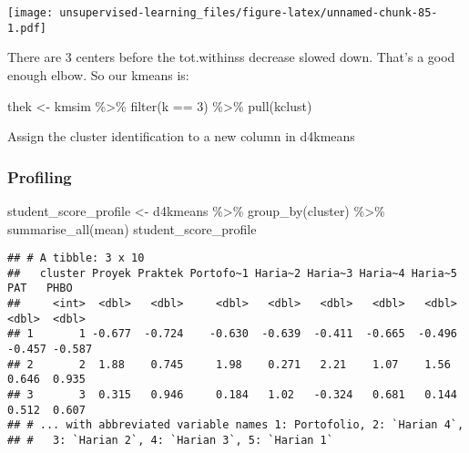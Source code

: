 \documentclass[
]{article}
\newenvironment{Shaded}{\begin{snugshade}}{\end{snugshade}}
\newcommand{\DecValTok}[1]{\textcolor[rgb]{0.00,0.00,0.81}{#1}}
\newcommand{\FunctionTok}[1]{\textcolor[rgb]{0.00,0.00,0.00}{#1}}
\newcommand{\NormalTok}[1]{#1}
\newcommand{\OtherTok}[1]{\textcolor[rgb]{0.56,0.35,0.01}{#1}}
\newcommand{\SpecialCharTok}[1]{\textcolor[rgb]{0.00,0.00,0.00}{#1}}
\begin{document}
\texttt{[image: unsupervised-learning\_files/figure-latex/unnamed-chunk-85-1.pdf]}

There are 3 centers before the tot.withinss decrease slowed down. That's
a good enough elbow. So our kmeans is:

\begin{Shaded}
\begin{Highlighting}[]
\NormalTok{thek }\OtherTok{\textless{}{-}}\NormalTok{ kmsim }\SpecialCharTok{\%\textgreater{}\%} 
  \FunctionTok{filter}\NormalTok{(k }\SpecialCharTok{==} \DecValTok{3}\NormalTok{) }\SpecialCharTok{\%\textgreater{}\%} 
  \FunctionTok{pull}\NormalTok{(kclust)}
\end{Highlighting}
\end{Shaded}

Assign the cluster identification to a new column in d4kmeans

\begin{Shaded}
\end{Shaded}

\hypertarget{profiling}{%
\subsubsection{Profiling}\label{profiling}}

\begin{Shaded}
\begin{Highlighting}[]
\NormalTok{student\_score\_profile }\OtherTok{\textless{}{-}} 
\NormalTok{d4kmeans }\SpecialCharTok{\%\textgreater{}\%} 
  \FunctionTok{group\_by}\NormalTok{(cluster) }\SpecialCharTok{\%\textgreater{}\%} 
  \FunctionTok{summarise\_all}\NormalTok{(mean)}
\NormalTok{student\_score\_profile}
\end{Highlighting}
\end{Shaded}

\begin{verbatim}
## # A tibble: 3 x 10
##   cluster Proyek Praktek Portofo~1 Haria~2 Haria~3 Haria~4 Haria~5    PAT   PHBO
##     <int>  <dbl>   <dbl>     <dbl>   <dbl>   <dbl>   <dbl>   <dbl>  <dbl>  <dbl>
## 1       1 -0.677  -0.724    -0.630  -0.639  -0.411  -0.665  -0.496 -0.457 -0.587
## 2       2  1.88    0.745     1.98    0.271   2.21    1.07    1.56   0.646  0.935
## 3       3  0.315   0.946     0.184   1.02   -0.324   0.681   0.144  0.512  0.607
## # ... with abbreviated variable names 1: Portofolio, 2: `Harian 4`,
## #   3: `Harian 2`, 4: `Harian 3`, 5: `Harian 1`
\end{verbatim}
\end{document}
